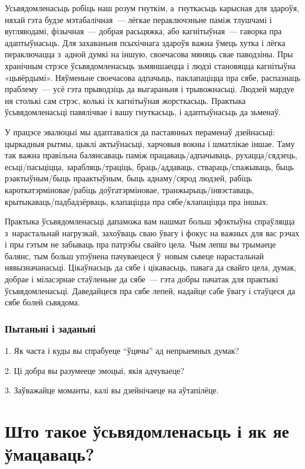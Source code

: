 Усьвядомленасьць робіць наш розум гнуткім, а~гнуткасьць карысная для здароўя, няхай гэта будзе мэтабалічная~--- лёгкае пераключэньне паміж тлушчамі і вугляводамі, фізычная~--- добрая расьцяжка, або кагнітыўная~--- гаворка пра адаптыўнасьць. Для захаваньня псыхічнага здароўя важна ўмець хутка і лёгка пераключацца з~адной думкі на іншую, своечасова мяняць свае паводзіны. Пры хранічным стрэсе ўсьвядомленасьць зьмяншаецца і людзі становяцца кагнітыўна «цьвёрдымі». Няўменьне своечасова адпачыць, паклапаціцца пра сябе, распазнаць праблему~--- усё гэта прыводзіць да выгараньня і трывожнасьці. Людзей мардуе ня столькі сам стрэс, колькі іх кагнітыўная жорсткасьць. Практыка ўсьвядомленасьці павялічвае і вашу гнуткасьць, і адаптыўнасьць да зьменаў.

У працэсе эвалюцыі мы адаптаваліся да пастаянных пераменаў дзейнасьці: цыркадныя рытмы, цыклі актыўнасьці, харчовыя вокны і шматлікае іншае. Таму так важна правільна балянсаваць паміж працаваць/адпачываць, рухацца/сядзець, есьці/пасьціцца, зарабляць/траціць, браць/аддаваць, ствараць/спажываць, быць рэактыўным/быць праактыўным, быць аднаму/сярод людзей, рабіць кароткатэрміновае/рабіць доўгатэрміновае, транжырыць/інвэставаць, крытыкаваць/падбадзёрваць, клапаціцца пра сябе/клапаціцца пра іншых.

Практыка ўсьвядомленасьці дапаможа вам нашмат больш эфэктыўна спраўляцца з~нарастальнай нагрузкай, захоўваць сваю ўвагу і фокус на важных для вас рэчах і пры гэтым не забываць пра патрэбы свайго цела. Чым лепш вы трымаеце балянс, тым больш упэўнена пачуваецеся ў~новым сьвеце нарастальнай нявызначанасьці. Цікаўнасьць да сябе і цікавасьць, павага да свайго цела, думак, добрае і міласэрнае стаўленьне да сябе~--- гэта добры пачатак для практыкі ўсьвядомленасьці. Даведайцеся пра сябе лепей, надайце сабе ўвагу і стаўцеся да сябе болей сьвядома.

\subsubsection{Пытаньні і заданьні}

1. Як часта і куды вы спрабуеце ``ўцячы'' ад непрыемных думак?

2. Ці добра вы разумееце эмоцыі, якія адчуваеце?

3. Заўважайце моманты, калі вы дзейнічаеце на аўтапілёце.


\section{Што такое ўсьвядомленасьць і як яе ўмацаваць?}

